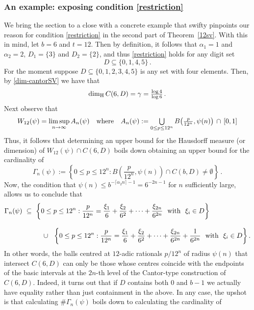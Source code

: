 \documentclass[12pt]{article}
\theoremstyle{definition}
\theoremstyle{remark}
\begin{document}
\subsubsection{An example: exposing condition \eqref{restriction}}   \label{exposecond}
We bring the section to  a close  with a concrete example that swifty pinpoints   our  reason  for condition \eqref{restriction} in the second part of Theorem~\ref{12sv}.  With this in mind, let $b=6$ and $t=12$.  Then by definition, it follows that $\alpha_1 = 1$ and  $\alpha_2 = 2$,  $D_1= \{3\}$   and  $D_2= \{2\}$,  and thus \eqref{restriction} holds   for any digit set  
$$D \subseteq \{0,1,4,5\}   \, .  $$
For the moment suppose $D \subseteq \{0,1,2,3,4,5\} $ is any set with four elements. Then, by  \eqref{dim-cantorSV} we have that $$ \textstyle{ \dim_{\rm H} C(6,D) =  \gamma=\frac{\log 4}{\log 6}  \, . }$$
Next observe that 
$$ \textstyle{
W_{12}(\psi) = \limsup\limits_{n\to \infty} A_n(\psi)   \quad {\rm where }   \quad  A_n(\psi):=
\bigcup\limits_{0\le p\le 12^{n}}  B\big(\frac{p}{12^{n}},\psi(n)\big)  \, \cap \, [0,1]} $$
Thus,  it follows  that determining an upper bound for the Hausdorff measure (or dimension)  of $W_{12}(\psi) \cap C(6,D)   $ boils down obtaining an upper bound for the cardinality of 
$$
\Gamma_n (\psi) := \left\{0\le p\le 12^{n}:  \textstyle{B\left(\frac{p}{12^{n}},\psi(n)\right)}\cap C(b,D)\neq\emptyset\right\}   \, . $$
Now, the condition that $\psi(n)\le b^{-\lceil\alpha_{2}n\rceil-1} = 6^{-2n-1}$  for $n$ sufficiently large,  allows us to conclude that
\begin{equation*}
\begin{aligned}
\Gamma_n (\psi)  & \ \subseteq \ \left\{0\le p\le 12^{n}:\frac{p}{12^{n}}=\frac{\xi_{1}}{6}+ \frac{\xi_{2}}{6^{2}}+\cdots+\frac{\xi_{2n}}{6^{2n}}\ \  {\rm with \ \  } \xi_{i} \in   D \right\} \\[2ex]
& ~\hspace{6ex} \cup \ \ \left\{0\le p\le 12^{n}:\frac{p}{12^{n}}=\frac{\xi_{1}}{6}+ \frac{\xi_{2}}{6^{2}}+\cdots+\frac{\xi_{2n}}{6^{2n}}+\frac{1}{6^{2n}}\ \  {\rm with \ \  } \xi_{i} \in   D \right\}.
\end{aligned}
\end{equation*}
In other words,  the balls centred at $12$-adic rationals  $p/12^n$ of radius $\psi(n)$ that intersect  $C(6,D)$ can only be those whose centres coincide with the endpoints of the basic intervals at the $2n$-th level of the Cantor-type construction  of $C(6,D)$.  Indeed, it turns out that if $D$ contains both $0$ and $b-1$ we actually have equality rather than just containment in the above.   In any case, the upshot is that   calculating   $\# \Gamma_n(\psi)$  boils down to calculating the cardinality of   
\end{document}
